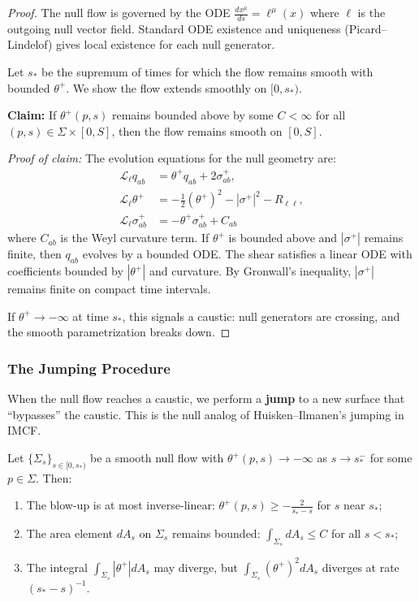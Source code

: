 \begin{proof}
The null flow is governed by the ODE $\frac{dx^\mu}{ds} = \ell^\mu(x)$ where $\ell$ is the outgoing null vector field. Standard ODE existence and uniqueness (Picard--Lindelof) gives local existence for each null generator. 

Let $s_*$ be the supremum of times for which the flow remains smooth with bounded $\theta^+$. We show the flow extends smoothly on $[0, s_*)$.

\textbf{Claim:} If $\theta^+(p, s)$ remains bounded above by some $C < \infty$ for all $(p, s) \in \Sigma \times [0, S]$, then the flow remains smooth on $[0, S]$.

\textit{Proof of claim:} The evolution equations for the null geometry are:
\begin{align}
\mathcal{L}_\ell q_{ab} &= \theta^+ q_{ab} + 2\sigma^+_{ab}, \\
\mathcal{L}_\ell \theta^+ &= -\frac{1}{2}(\theta^+)^2 - |\sigma^+|^2 - R_{\ell\ell}, \\
\mathcal{L}_\ell \sigma^+_{ab} &= -\theta^+ \sigma^+_{ab} + C_{ab}
\end{align}
where $C_{ab}$ is the Weyl curvature term. If $\theta^+$ is bounded above and $|\sigma^+|$ remains finite, then $q_{ab}$ evolves by a bounded ODE. The shear satisfies a linear ODE with coefficients bounded by $|\theta^+|$ and curvature. By Gronwall's inequality, $|\sigma^+|$ remains finite on compact time intervals.

If $\theta^+ \to -\infty$ at time $s_*$, this signals a caustic: null generators are crossing, and the smooth parametrization breaks down.
\end{proof}

\subsubsection{The Jumping Procedure}

When the null flow reaches a caustic, we perform a \textbf{jump} to a new surface that ``bypasses'' the caustic. This is the null analog of Huisken--Ilmanen's jumping in IMCF.

\begin{theorem}
\label{thm:caustic-blowup}
Let $\{\Sigma_s\}_{s \in [0, s_*)}$ be a smooth null flow with $\theta^+(p, s) \to -\infty$ as $s \to s_*^-$ for some $p \in \Sigma$. Then:
\begin{enumerate}[label=(\roman*)]
\item The blow-up is at most inverse-linear: $\theta^+(p, s) \geq -\frac{2}{s_* - s}$ for $s$ near $s_*$;
\item The area element $dA_s$ on $\Sigma_s$ remains bounded: $\int_{\Sigma_s} dA_s \leq C$ for all $s < s_*$;
\item The integral $\int_{\Sigma_s} |\theta^+| dA_s$ may diverge, but $\int_{\Sigma_s} (\theta^+)^2 dA_s$ diverges at rate $(s_* - s)^{-1}$.
\end{enumerate}
\end{theorem}

